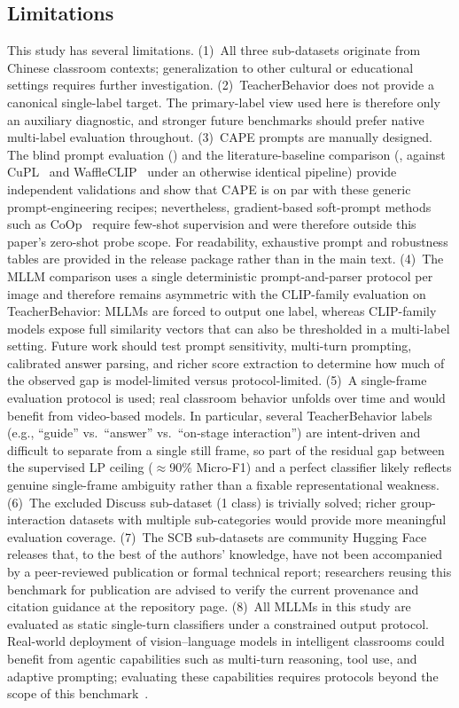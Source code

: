 \documentclass[symmetry,article,submit,pdftex,moreauthors]{Definitions/mdpi}
\begin{document}
\subsection{Limitations}

This study has several limitations.
\label{sec:limitations}
(1)~All three sub-datasets originate from Chinese classroom contexts; generalization to other cultural or educational settings requires further investigation.
(2)~TeacherBehavior does not provide a canonical single-label target. The primary-label view used here is therefore only an auxiliary diagnostic, and stronger future benchmarks should prefer native multi-label evaluation throughout.
(3)~CAPE prompts are manually designed. The blind prompt evaluation () and the literature-baseline comparison (, against CuPL~\cite{pratt2023cupl} and WaffleCLIP~\cite{roth2023waffleclip} under an otherwise identical pipeline) provide independent validations and show that CAPE is on par with these generic prompt-engineering recipes; nevertheless, gradient-based soft-prompt methods such as CoOp~\cite{zhou2022learning} require few-shot supervision and were therefore outside this paper's zero-shot probe scope. For readability, exhaustive prompt and robustness tables are provided in the release package rather than in the main text.
(4)~The MLLM comparison uses a single deterministic prompt-and-parser protocol per image and therefore remains asymmetric with the CLIP-family evaluation on TeacherBehavior: MLLMs are forced to output one label, whereas CLIP-family models expose full similarity vectors that can also be thresholded in a multi-label setting. Future work should test prompt sensitivity, multi-turn prompting, calibrated answer parsing, and richer score extraction to determine how much of the observed gap is model-limited versus protocol-limited.
(5)~A single-frame evaluation protocol is used; real classroom behavior unfolds over time and would benefit from video-based models. In particular, several TeacherBehavior labels (e.g., ``guide'' vs.\ ``answer'' vs.\ ``on-stage interaction'') are intent-driven and difficult to separate from a single still frame, so part of the residual gap between the supervised LP ceiling ($\approx$90\% Micro-F1) and a perfect classifier likely reflects genuine single-frame ambiguity rather than a fixable representational weakness.
(6)~The excluded Discuss sub-dataset (1 class) is trivially solved; richer group-interaction datasets with multiple sub-categories would provide more meaningful evaluation coverage.
(7)~The SCB sub-datasets are community Hugging Face releases that, to the best of the authors' knowledge, have not been accompanied by a peer-reviewed publication or formal technical report; researchers reusing this benchmark for publication are advised to verify the current provenance and citation guidance at the repository page.
(8)~All MLLMs in this study are evaluated as static single-turn classifiers under a constrained output protocol. Real-world deployment of vision--language models in intelligent classrooms could benefit from agentic capabilities such as multi-turn reasoning, tool use, and adaptive prompting; evaluating these capabilities requires protocols beyond the scope of this benchmark~\cite{ma2026agentic_ai}.
\end{document}
